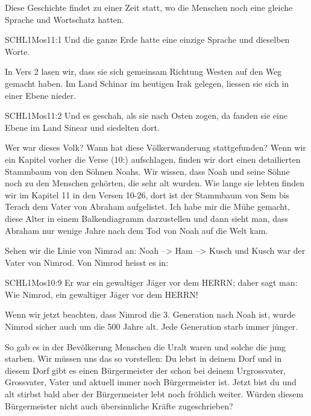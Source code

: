 \documentclass[14pt]{../../inc/mybib}
\newenvironment{block}[1][]{%
  \vspace{1.5em}%
  \noindent\textbf{#1}\par%
  \vspace{0.0em}%
}{%
  \vspace{1em}%
}
\begin{document}
    \vspace{1em}
    \begin{block}
    Diese Geschichte findet zu einer Zeit statt, wo die Menschen noch eine gleiche Sprache und Wortschatz hatten.
    \begin{bibelbox}{SCHL}{1Mos}{11:1}
        Und die ganze Erde hatte eine einzige Sprache und dieselben Worte.
    \end{bibelbox}    
    In Vers 2 lasen wir, dass sie sich gemeinsam Richtung Westen auf den Weg gemacht haben. Im Land Schinar im heutigen Irak gelegen, liessen sie sich in einer Ebene nieder.    
    \begin{bibelbox}{SCHL}{1Mos}{11:2}
        Und es geschah, als sie nach Osten zogen, da fanden sie eine Ebene im Land Sinear und siedelten dort.
    \end{bibelbox}
    Wer war dieses Volk? Wann hat diese Völkerwanderung stattgefunden? Wenn wir ein Kapitel vorher die Verse  (10:) aufschlagen, finden wir dort einen detailierten Stammbaum von den Söhnen Noahs. Wir wissen, dass Noah und seine Söhne noch zu den Menschen gehörten, die sehr alt wurden. Wie lange sie lebten finden wir im Kapitel 11 in den Versen 10-26, dort ist der Stammbaum von Sem bis Terach dem Vater von Abraham aufgelistet. Ich habe mir die Mühe gemacht, diese Alter in einem Balkendiagramm darzustellen und dann sieht man, dass Abraham nur wenige Jahre nach dem Tod von Noah auf die Welt kam. 

    
    Sehen wir die Linie von Nimrad an: Noah --> Ham --> Kusch und Kusch war der Vater von Nimrod.
    Von Nimrod heisst es in:
    \begin{bibelbox}{SCHL}{1Mos}{10:9}
        Er war ein gewaltiger Jäger vor dem HERRN; daher sagt man: Wie Nimrod, ein gewaltiger Jäger vor dem HERRN!
    \end{bibelbox}
    Wenn wir jetzt beachten, dass Nimrod die 3. Generation nach Noah ist, wurde Nimrod sicher auch um die 500 Jahre alt. Jede Generation starb immer jünger. 
\end{block}
\begin{block}
    So gab es in der Bevölkerung Menschen die Uralt waren und solche die jung starben. Wir müssen uns das so vorstellen:  Du lebst in deinem Dorf und in diesem Dorf gibt es einen Bürgermeister der schon bei deinem Urgrossvater, Grossvater, Vater und aktuell immer noch Bürgermeister ist. Jetzt bist du und alt stirbst bald aber der Bürgermeister lebt noch fröhlich weiter. Würden diesem Bürgermeister nicht auch übersinnliche Kräfte zugeschrieben? 
\end{block}
\end{document}
